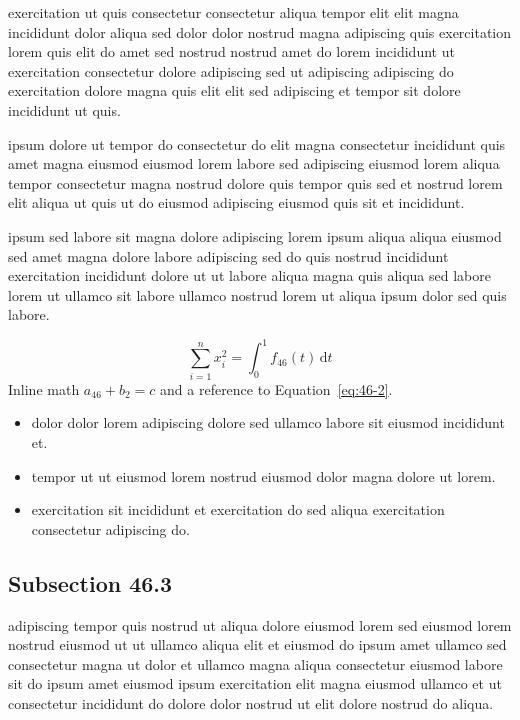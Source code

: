 \documentclass{article}
\begin{document}
exercitation ut quis consectetur consectetur aliqua tempor elit elit magna incididunt dolor aliqua sed dolor dolor nostrud magna adipiscing quis exercitation lorem quis elit do amet sed nostrud nostrud amet do lorem incididunt ut exercitation consectetur dolore adipiscing sed ut adipiscing adipiscing do exercitation dolore magna quis elit elit sed adipiscing et tempor sit dolore incididunt ut quis.

ipsum dolore ut tempor do consectetur do elit magna consectetur incididunt quis amet magna eiusmod eiusmod lorem labore sed adipiscing eiusmod lorem aliqua tempor consectetur magna nostrud dolore quis tempor quis sed et nostrud lorem elit aliqua ut quis ut do eiusmod adipiscing eiusmod quis sit et incididunt.

ipsum sed labore sit magna dolore adipiscing lorem ipsum aliqua aliqua eiusmod sed amet magna dolore labore adipiscing sed do quis nostrud incididunt exercitation incididunt dolore ut ut labore aliqua magna quis aliqua sed labore lorem ut ullamco sit labore ullamco nostrud lorem ut aliqua ipsum dolor sed quis labore.

\begin{equation}\label{eq:46-2}
  \sum_{i=1}^{n} x_i^{2} = \int_0^1 f_{46}(t)\,\mathrm{d}t
\end{equation}
Inline math $a_{46} + b_{2} = c$ and a reference to Equation~\eqref{eq:46-2}.

\begin{itemize}
  \item dolor dolor lorem adipiscing dolore sed ullamco labore sit eiusmod incididunt et.
  \item tempor ut ut eiusmod lorem nostrud eiusmod dolor magna dolore ut lorem.
  \item exercitation sit incididunt et exercitation do sed aliqua exercitation consectetur adipiscing do.
\end{itemize}

\subsection{Subsection 46.3}\label{sec:46-3}
adipiscing tempor quis nostrud ut aliqua dolore eiusmod lorem sed eiusmod lorem nostrud eiusmod ut ut ullamco aliqua elit et eiusmod do ipsum amet ullamco sed consectetur magna ut dolor et ullamco magna aliqua consectetur eiusmod labore sit do ipsum amet eiusmod ipsum exercitation elit magna eiusmod ullamco et ut consectetur incididunt do dolore dolor nostrud ut elit dolore nostrud do aliqua.
\end{document}
